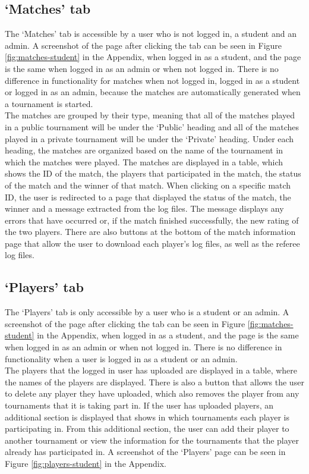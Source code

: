 \documentclass[a4paper, 11pt]{report}
\begin{document}
\subsection{`Matches' tab}
\label{sec:impl-tab-matches}

The `Matches' tab is accessible by a user who is not logged in, a student
and an admin. A screenshot of the page after clicking the tab can be seen in
Figure \ref{fig:matches-student} in the Appendix, when logged in as a student,
and the page is the same when logged in as an admin or when not logged in.
There is no difference in functionality for matches when not logged in,
logged in as a student or logged in as an admin, because the matches are
automatically generated when a tournament is started. \\

The matches are grouped by their type, meaning that all of the matches played in
a public tournament will be under the `Public' heading and all of the matches
played in a private tournament will be under the `Private' heading. Under each
heading, the matches are organized based on the name of the tournament in which
the matches were played. The matches are displayed in a table, which shows the
ID of the match, the players that participated in the match, the status of the
match and the winner of that match. When clicking on a specific match ID, the user
is redirected to a page that displayed the status of the match, the winner and a
message extracted from the log files. The message displays any errors that have
occurred or, if the match finished successfully, the new rating of the two
players. There are also buttons at the bottom of the match information page that
allow the user to download each player's log files, as well as the referee log
files.

\subsection{`Players' tab}
\label{sec:impl-tab-players}

The `Players' tab is only accessible by a user who is a student or an admin. A
screenshot of the page after clicking the tab can be seen in Figure
\ref{fig:matches-student} in the Appendix, when logged in as a student, and the
page is the same when logged in as an admin or when not logged in. There is
no difference in functionality when a user is logged in as a student or an
admin. \\

The players that the logged in user has uploaded are displayed in a table, where
the names of the players are displayed. There is also a button that allows the
user to delete any player they have uploaded, which also removes the player from
any tournaments that it is taking part in. If the user has uploaded players, an
additional section is displayed that shows in which tournaments each player is
participating in. From this additional section, the user can add their player
to another tournament or view the information for the tournaments that the player
already has participated in. A screenshot of the `Players' page can be seen in
Figure \ref{fig:players-student} in the Appendix.
\end{document}
